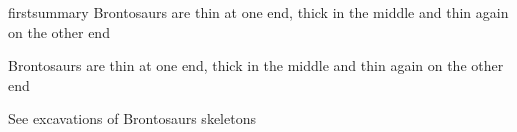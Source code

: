 \documentclass{article}
\begin{document}
\begin{Summary}{}{firstsummary}
Brontosaurs are thin at one end, thick in the middle and thin again on the other end
\end{Summary}

\begin{summary}[boxed title style={colback=yellow},colback=green]
Brontosaurs are thin at one end, thick in the middle and thin again on the other end

See excavations of Brontosaurs skeletons
\end{summary}
\end{document}
